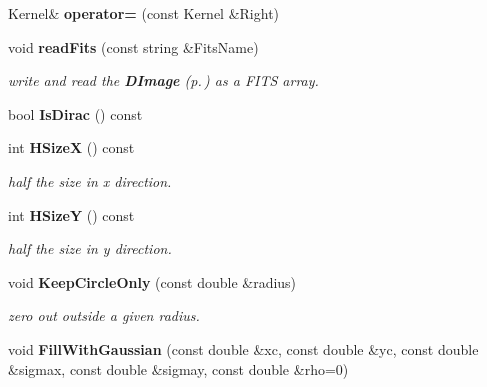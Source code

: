 \begin{CompactItemize}
\item 
{}
Kernel\& {\bf operator=} (const Kernel \&Right)\label{class_kernel_a7}

\item 
{}
void {\bf read\-Fits} (const string \&Fits\-Name)\label{class_kernel_a8}

\begin{CompactList}\small\item\em write and read the {\bf DImage} {\rm (p.\,\pageref{class_dimage})} as a FITS array.\item\end{CompactList}\item 
{}
bool {\bf Is\-Dirac} () const\label{class_kernel_a9}

\item 
{}
int {\bf HSize\-X} () const\label{class_kernel_a10}

\begin{CompactList}\small\item\em half the size in x direction.\item\end{CompactList}\item 
{}
int {\bf HSize\-Y} () const\label{class_kernel_a11}

\begin{CompactList}\small\item\em half the size in y direction.\item\end{CompactList}\item 
{}
void {\bf Keep\-Circle\-Only} (const double \&radius)\label{class_kernel_a12}

\begin{CompactList}\small\item\em zero out outside a given radius.\item\end{CompactList}\item 
{}
void {\bf Fill\-With\-Gaussian} (const double \&xc, const double \&yc, const double \&sigmax, const double \&sigmay, const double \&rho=0)\label{class_kernel_a13}


\end{CompactItemize}
